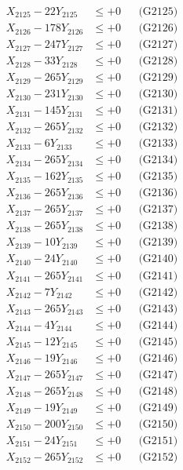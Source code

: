 \documentclass[a4paper,10pt]{article}
\begin{document}
{\begin{align}
X_{2125} - 22Y_{2125} &\leq +0 && \text{(G2125)} \\
X_{2126} - 178Y_{2126} &\leq +0 && \text{(G2126)} \\
X_{2127} - 247Y_{2127} &\leq +0 && \text{(G2127)} \\
X_{2128} - 33Y_{2128} &\leq +0 && \text{(G2128)} \\
X_{2129} - 265Y_{2129} &\leq +0 && \text{(G2129)} \\
X_{2130} - 231Y_{2130} &\leq +0 && \text{(G2130)} \\
\allowbreak
X_{2131} - 145Y_{2131} &\leq +0 && \text{(G2131)} \\
X_{2132} - 265Y_{2132} &\leq +0 && \text{(G2132)} \\
X_{2133} - 6Y_{2133} &\leq +0 && \text{(G2133)} \\
X_{2134} - 265Y_{2134} &\leq +0 && \text{(G2134)} \\
X_{2135} - 162Y_{2135} &\leq +0 && \text{(G2135)} \\
X_{2136} - 265Y_{2136} &\leq +0 && \text{(G2136)} \\
X_{2137} - 265Y_{2137} &\leq +0 && \text{(G2137)} \\
X_{2138} - 265Y_{2138} &\leq +0 && \text{(G2138)} \\
X_{2139} - 10Y_{2139} &\leq +0 && \text{(G2139)} \\
X_{2140} - 24Y_{2140} &\leq +0 && \text{(G2140)} \\
\allowbreak
X_{2141} - 265Y_{2141} &\leq +0 && \text{(G2141)} \\
X_{2142} - 7Y_{2142} &\leq +0 && \text{(G2142)} \\
X_{2143} - 265Y_{2143} &\leq +0 && \text{(G2143)} \\
X_{2144} - 4Y_{2144} &\leq +0 && \text{(G2144)} \\
X_{2145} - 12Y_{2145} &\leq +0 && \text{(G2145)} \\
X_{2146} - 19Y_{2146} &\leq +0 && \text{(G2146)} \\
X_{2147} - 265Y_{2147} &\leq +0 && \text{(G2147)} \\
X_{2148} - 265Y_{2148} &\leq +0 && \text{(G2148)} \\
X_{2149} - 19Y_{2149} &\leq +0 && \text{(G2149)} \\
X_{2150} - 200Y_{2150} &\leq +0 && \text{(G2150)} \\
\allowbreak
X_{2151} - 24Y_{2151} &\leq +0 && \text{(G2151)} \\
X_{2152} - 265Y_{2152} &\leq +0 && \text{(G2152)} \\

\end{align}}
\end{document}
